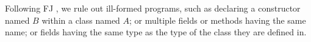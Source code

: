 Following FJ \cite{featherweight}, we rule out ill-formed programs, such as declaring a constructor named $B$ within a class named $A$; or multiple fields or methods having the same name; or fields having the same type as the type of the class they are defined in.



